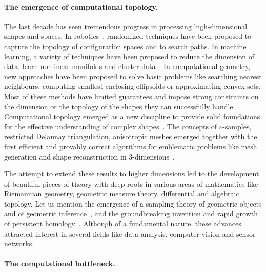 \paragraph{The emergence of computational topology.}
The last decade has seen tremendous progress in processing high-dimensional shapes and spaces. In robotics~\cite{sml-pa-2006}, randomized techniques have been proposed to capture the topology of configuration spaces and to search paths. In machine learning, a variety of techniques have been proposed to reduce the dimension of data, learn nonlinear manifolds and cluster data~\cite{hs-fmmds-2006}. In computational geometry, new approaches have been proposed to solve basic problems like searching nearest neighbours, computing smallest enclosing ellipsoids or approximating convex sets.
Most  of these methods have limited guarantees and 
impose strong constraints on the dimension or the topology of the shapes they can successfully handle. Computational topology emerged as a new discipline  to 
provide solid foundations for the effective understanding of complex shapes~\cite{hh-ct-2010}. 
The concepts of $\varepsilon$-samples, restricted Delaunay triangulation, anisotropic meshes emerged together with the first efficient and provably correct algorithms for emblematic problems like mesh generation and shape reconstruction in 3-dimensions~\cite{geometrica-ecg-book}. 

 The attempt to extend these results to higher dimensions led to the development of beautiful pieces of theory with deep roots in various areas of mathematics like Riemannian geometry, geometric measure theory, differential and algebraic topology. Let us mention  the emergence of a sampling theory of geometric objects and of geometric inference~\cite{geometrica-ccl09}, and the groundbreaking invention and rapid growth of persistent homology~\cite{eh-ph-2008}.
Although of a fundamental nature, these advances 
attracted  interest in several fields like data analysis, computer vision and sensor networks.

\paragraph{The computational bottleneck.}


